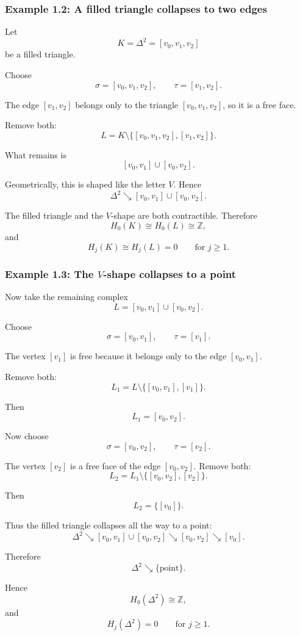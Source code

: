 \documentclass[12pt,a4paper]{article}
\theoremstyle{notespace}
\begin{document}
\subsubsection{Example 1.2: A filled triangle collapses to two edges}

Let
\[
K=\Delta^2=[v_0,v_1,v_2]
\]
be a filled triangle.

Choose
\[
\sigma=[v_0,v_1,v_2],
\qquad
\tau=[v_1,v_2].
\]

The edge \([v_1,v_2]\) belongs only to the triangle \([v_0,v_1,v_2]\), so it is a free face.

Remove both:
\[
L=K\setminus\{[v_0,v_1,v_2],[v_1,v_2]\}.
\]

What remains is
\[
[v_0,v_1]\cup [v_0,v_2].
\]

Geometrically, this is shaped like the letter \(V\). Hence
\[
\Delta^2\searrow [v_0,v_1]\cup [v_0,v_2].
\]

The filled triangle and the \(V\)-shape are both contractible. Therefore
\[
H_0(K)\cong H_0(L)\cong \mathbb Z,
\]
and
\[
H_j(K)\cong H_j(L)=0
\qquad
\text{for }j\geq 1.
\]

\subsubsection{Example 1.3: The \(V\)-shape collapses to a point}

Now take the remaining complex
\[
L=[v_0,v_1]\cup [v_0,v_2].
\]

Choose
\[
\sigma=[v_0,v_1],
\qquad
\tau=[v_1].
\]

The vertex \([v_1]\) is free because it belongs only to the edge \([v_0,v_1]\).

Remove both:
\[
L_1=L\setminus\{[v_0,v_1],[v_1]\}.
\]

Then
\[
L_1=[v_0,v_2].
\]

Now choose
\[
\sigma=[v_0,v_2],
\qquad
\tau=[v_2].
\]

The vertex \([v_2]\) is a free face of the edge \([v_0,v_2]\). Remove both:
\[
L_2=L_1\setminus\{[v_0,v_2],[v_2]\}.
\]

Then
\[
L_2=\{[v_0]\}.
\]

Thus the filled triangle collapses all the way to a point:
\[
\Delta^2
\searrow
[v_0,v_1]\cup[v_0,v_2]
\searrow
[v_0,v_2]
\searrow
[v_0].
\]

Therefore
\[
\Delta^2\searrow \{\text{point}\}.
\]

Hence
\[
H_0(\Delta^2)\cong \mathbb Z,
\]
and
\[
H_j(\Delta^2)=0
\qquad
\text{for }j\geq 1.
\]
\end{document}

